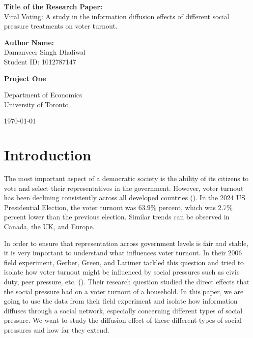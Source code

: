 \documentclass[11pt]{article}
\begin{document}
\begin{titlepage}
    \centering
    \vspace*{2cm}
    
    \vspace{0.5cm}

    \Large{\textbf{Title of the Research Paper:}}\\
    Viral Voting: A study in the information diffusion effects of different social pressure treatments on voter turnout.
    
    \vspace{0.5cm}

    \Large{\textbf{Author Name:}}\\
    \Large{Damanveer Singh Dhaliwal}\\
    \Large{Student ID: 1012787147}

    \vspace{0.5cm}
    
    \Large{\textbf{Project One}}
    
    \vfill
    
    \large{Department of Economics}\\
    \large{University of Toronto}
    
    \vspace{0.8cm}
    
    \large{\today}
\end{titlepage}

\section{Introduction}
The most important aspect of a democratic society is the ability of its citizens to vote and select their representatives in the government. However, voter turnout has been declining consistently across all developed countries (\cite{solijonov_voter_nodate}). In the 2024 US Presidential Election, the voter turnout was $63.9\%$ percent, which was $2.7\%$ percent lower than the previous election. Similar trends can be observed in Canada, the UK, and Europe.

In order to ensure that representation across government levels is fair and stable, it is very important to understand what influences voter turnout. In their 2006 field experiment, Gerber, Green, and Larimer tackled this question and tried to isolate how voter turnout might be influenced by social pressures such as civic duty, peer pressure, etc. (\cite{gerber_social_2008}). Their research question studied the direct effects that the social pressure had on a voter turnout of a household. In this paper, we are going to use the data from their field experiment and isolate how information diffuses through a social network, especially concerning different types of social pressure. We want to study the diffusion effect of these different types of social pressures and how far they extend. 
\end{document}
